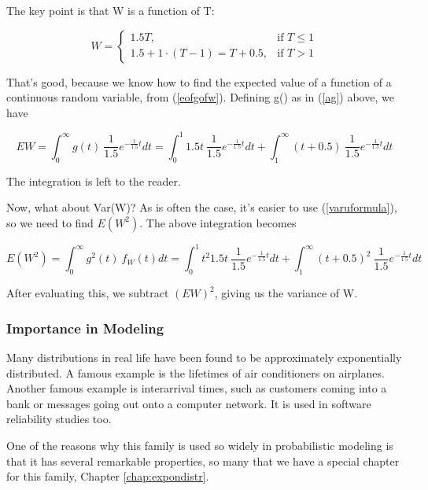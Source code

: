 The key point is that W is a function of T:

\begin{equation}
\label{ag}
W = 
\begin{cases}
1.5 T, & \text{if $T \leq 1$} \\
1.5 + 1 \cdot (T-1) = T + 0.5, & \text{if $T > 1$} 
\end{cases}
\end{equation}

That's good, because we know how to find the expected value of a
function of a continuous random variable, from (\ref{eofgofw}).
Defining g() as in (\ref{ag}) above, we have

\begin{equation}
EW = \int_{0}^{\infty} g(t) ~ \frac{1}{1.5} e^{-\frac{1}{1.5}t} dt
= \int_{0}^{1} 1.5 t ~ \frac{1}{1.5} e^{-\frac{1}{1.5}t} dt +
\int_{1}^{\infty} (t+0.5) ~ \frac{1}{1.5} e^{-\frac{1}{1.5}t} dt
\end{equation}

The integration is left to the reader.

Now, what about Var(W)?  As is often the case, it's easier to use
(\ref{varuformula}), so we need to find $E(W^2)$.  The above integration
becomes

\begin{equation}
E(W^2) 
= \int_{0}^{\infty} g^2(t) ~ f_W (t) dt
= \int_{0}^{1} t^2 1.5 t ~ \frac{1}{1.5} e^{-\frac{1}{1.5}t} dt +
  \int_{1}^{\infty} (t+0.5)^2 ~ \frac{1}{1.5} e^{-\frac{1}{1.5}t} dt
\end{equation}

After evaluating this, we subtract $(EW)^2$, giving us the variance of
W.

\subsubsection{Importance in Modeling}

Many distributions in real life have been found to be approximately
exponentially distributed.  A famous example is the lifetimes of air
conditioners on airplanes.  Another famous example is interarrival
times, such as customers coming into a bank or messages going out onto a
computer network.  It is used in software reliability studies too.

One of the reasons why this family is used so widely in probabilistic
modeling is that it has several remarkable properties, so many that we
have a special chapter for this family, Chapter \ref{chap:expondistr}.

